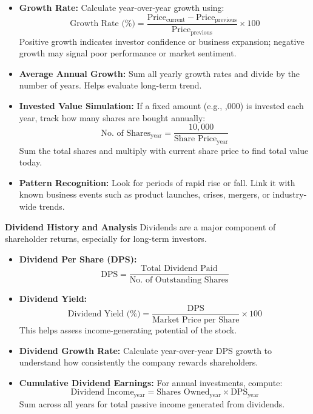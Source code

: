 \documentclass[12pt]{article}
\begin{document}
\begin{itemize}
    \item \textbf{Growth Rate:} Calculate year-over-year growth using:
    \[
    \text{Growth Rate (\%)} = \frac{\text{Price}_{\text{current}} - \text{Price}_{\text{previous}}}{\text{Price}_{\text{previous}}} \times 100
    \]
    Positive growth indicates investor confidence or business expansion; negative growth may signal poor performance or market sentiment.

    \item \textbf{Average Annual Growth:} Sum all yearly growth rates and divide by the number of years. Helps evaluate long-term trend.

    \item \textbf{Invested Value Simulation:} If a fixed amount (e.g., ,000) is invested each year, track how many shares are bought annually:
    \[
    \text{No. of Shares}_{\text{year}} = \frac{10,000}{\text{Share Price}_{\text{year}}}
    \]
    Sum the total shares and multiply with current share price to find total value today.

    \item \textbf{Pattern Recognition:} Look for periods of rapid rise or fall. Link it with known business events such as product launches, crises, mergers, or industry-wide trends.
\end{itemize}

\textbf{Dividend History and Analysis}
Dividends are a major component of shareholder returns, especially for long-term investors.

\begin{itemize}
    \item \textbf{Dividend Per Share (DPS):}
    \[
    \text{DPS} = \frac{\text{Total Dividend Paid}}{\text{No. of Outstanding Shares}}
    \]

    \item \textbf{Dividend Yield:}
    \[
    \text{Dividend Yield (\%)} = \frac{\text{DPS}}{\text{Market Price per Share}} \times 100
    \]
    This helps assess income-generating potential of the stock.

    \item \textbf{Dividend Growth Rate:} Calculate year-over-year DPS growth to understand how consistently the company rewards shareholders.

    \item \textbf{Cumulative Dividend Earnings:} For annual investments, compute:
    \[
    \text{Dividend Income}_{\text{year}} = \text{Shares Owned}_{\text{year}} \times \text{DPS}_{\text{year}}
    \]
    Sum across all years for total passive income generated from dividends.
\end{itemize}
\end{document}
